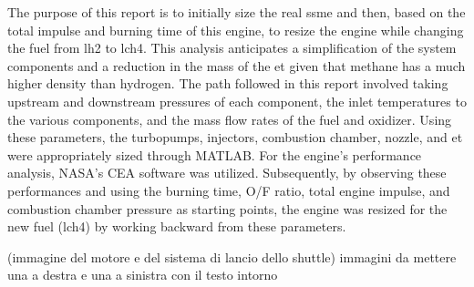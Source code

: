 The purpose of this report is to initially size the real \acrfull{ssme} and then, based on the total impulse and burning time of this engine, to resize the engine while changing the fuel from \acrlong{lh2} to \acrfull{lch4}. 
This analysis anticipates a simplification of the system components and a reduction in the mass of the \acrfull{et} given that methane has a much higher density than hydrogen. 
The path followed in this report involved taking upstream and downstream pressures of each component, the inlet temperatures to the various components, and the mass flow rates of the fuel and oxidizer.
Using these parameters, the turbopumps, injectors, combustion chamber, nozzle, and \acrlong{et} were appropriately sized through MATLAB. For the engine's performance analysis, NASA's CEA software was utilized.
Subsequently, by observing these performances and using the burning time, O/F ratio, total engine impulse, and combustion chamber pressure as starting points, the engine was resized for the new fuel (\acrshort{lch4}) by working backward from these parameters.

(immagine del motore e del sistema di lancio dello shuttle) immagini da mettere una a destra e una a sinistra con il testo intorno


